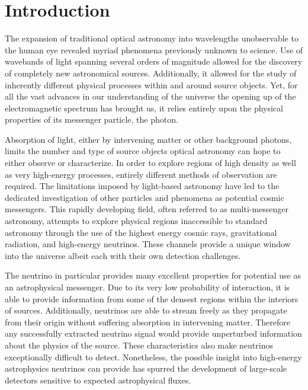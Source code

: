 \documentclass{gatech-thesis}
\begin{document}
\chapter{Introduction}
The expansion of traditional optical astronomy into wavelengths unobservable to the human eye revealed myriad phenomena previously unknown to science. Use of wavebands of light spanning several orders of magnitude allowed for the discovery of completely new astronomical sources. Additionally, it allowed for the study of inherently different physical processes within and around source objects. Yet, for all the vast advances in our understanding of the universe the opening up of the electromagnetic spectrum has brought us, it relies entirely upon the physical properties of its messenger particle, the photon.

Absorption of light, either by intervening matter or other background photons, limits the number and type of source objects optical astronomy can hope to either observe or characterize. In order to explore regions of high density as well as very high-energy processes, entirely different methods of observation are required. The limitations imposed by light-based astronomy have led to the dedicated investigation of other particles and phenomena as potential cosmic messengers. This rapidly developing field, often referred to as multi-messenger astronomy, attempts to explore physical regions inaccessible to standard astronomy through the use of the highest energy cosmic rays, gravitational radiation, and high-energy neutrinos. These channels provide a unique window into the universe albeit each with their own detection challenges.

The neutrino in particular provides many excellent properties for potential use as an astrophysical messenger. Due to its very low probability of interaction, it is able to provide information from some of the densest regions within the interiors of sources. Additionally, neutrinos are able to stream freely as they propagate from their origin without suffering absorption in intervening matter. Therefore any successfully extracted neutrino signal would provide unperturbed information about the physics of the source. These characteristics also make neutrinos exceptionally difficult to detect. Nonetheless, the possible insight into high-energy astrophysics neutrinos can provide has spurred the development of large-scale detectors sensitive to expected astrophysical fluxes.
\end{document}
